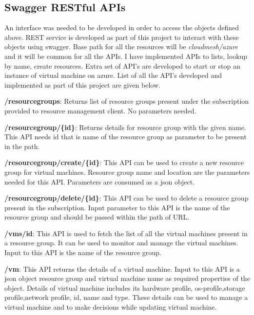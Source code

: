 \subsection{Swagger RESTful APIs}
An interface was needed to be developed in order to access the objects defined
above. REST service is developed as part of this project to interact with these
objects using swagger. Base path for all the resources will be
\textit{cloudmesh/azure} and it will be common for all the APIs. I have
implemented APIs to lists, lookup by name, create resources. Extra set of API's
are developed to start or stop an instance of virtual machine on azure. List of
all the API's developed and implemented as part of this project are given
below.

\begin{description}
\item \textbf{/resourcegroups}: Returns list of resource groups present under
the subscription provided to resource management client. No parameters needed.

\item \textbf{/resourcegroup/\{id\}}: Returns details for resource group with
the given name. This API needs id that is name of the resource group as
parameter to be present in the path.

\item \textbf{/resourcegroup/create/\{id\}}: This API can be used to create a
new resource group for virtual machines. Resource group name and location are
the parameters needed for this API. Parameters are consumed as a json object.

\item \textbf{/resourcegroup/delete/\{id\}}: This API can be used to delete a
resource group present in the subscription. Input parameter to this API is the
name of the resource group and should be passed within the path of URL.

\item \textbf{/vms/{id}}: This API is used to fetch the list of all the virtual
machines present in a resource group. It can be used to monitor and manage the
virtual machines. Input to this API is the name of the resource group.

\item \textbf{/vm}: This API returns the details of a virtual machine. Input to
this API is a json object resource group and virtual machine name as required
properties of the object. Details of virtual machine includes its hardware
profile, os-profile,storage profile,network profile, id, name and type. These
details can be used to manage a virtual machine and to make decisions while
updating virtual machine.


\end{description}
